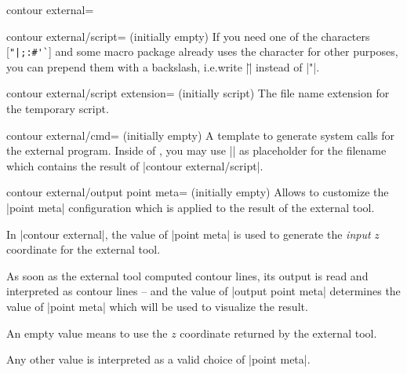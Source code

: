 {{\begin{plottype}[/pgfplots]{
    contour external=\textcolor{black}{}%
}
\begin{pgfplotskey}{contour external/script= (initially empty)}
        If you need one of the characters [\verb!"|;:#'`!] and some macro
        package already uses the character for other purposes, you can prepend
        them with a backslash, i.e.\@ write |\"| instead of |"|.
    \end{pgfplotskey}

    \begin{pgfplotskey}{contour external/script extension= (initially script)}
        The file name extension for the temporary script.
    \end{pgfplotskey}

    \begin{pgfplotskey}{contour external/cmd= (initially empty)}
        A template to generate system calls for the external program. Inside of
        , you may use |\script| as placeholder for the
        filename which contains the result of |contour external/script|.
    \end{pgfplotskey}

    \begin{pgfplotskey}{contour external/output point meta= (initially empty)}
        Allows to customize the |point meta| configuration which is applied to
        the result of the external tool.

        In |contour external|, the value of |point meta| is used to generate
        the \emph{input} $z$ coordinate for the external tool.

        As soon as the external tool computed contour lines, its output is read
        and interpreted as contour lines -- and the value of
        |output point meta| determines the value of |point meta| which will be
        used to visualize the result.

        An empty value means to use the $z$ coordinate returned by the external
        tool.

        Any other value is interpreted as a valid choice of |point meta|.
    \end{pgfplotskey}


\end{plottype}}}
